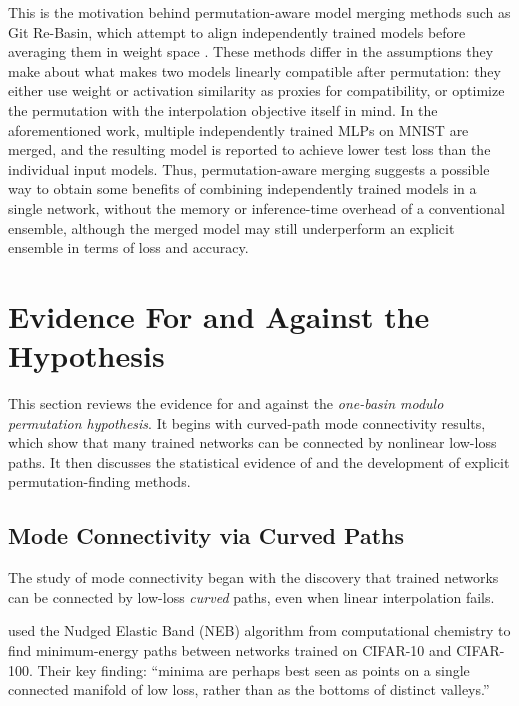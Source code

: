 \documentclass[11pt,a4paper]{report}
\begin{document}
This is the motivation behind permutation-aware model merging methods such as Git 
Re-Basin, which attempt to align independently trained models before averaging 
them in weight space \citet{ainsworth2023git}. These methods differ in the assumptions they make about what makes two models linearly compatible after permutation: they either use weight or activation similarity as 
proxies for compatibility, or optimize the permutation with the interpolation 
objective itself in mind. In the aforementioned work, multiple independently trained MLPs on MNIST are merged, and the resulting model is reported to achieve lower test loss than the individual input models. Thus, permutation-aware merging suggests a possible way to obtain some benefits of combining independently trained models in a single network, without the memory or inference-time overhead of a conventional ensemble, although the merged model may 
still underperform an explicit ensemble in terms of loss and accuracy.

\section{Evidence For and Against the Hypothesis}
\label{sec:literature}

This section reviews the evidence for and against the \textit{one-basin modulo 
permutation hypothesis}. It begins with curved-path mode connectivity results, 
which show that many trained networks can be connected by nonlinear low-loss paths. 
It then discusses the statistical evidence of \citet{entezari2021role} and the 
development of explicit permutation-finding methods.

\subsection{Mode Connectivity via Curved Paths}

The study of mode connectivity began with the discovery that trained networks can be connected by low-loss \textit{curved} paths, even when linear interpolation fails.

\citet{draxler2018essentially} used the Nudged Elastic Band (NEB) algorithm from computational chemistry to find minimum-energy paths between networks trained on CIFAR-10 and CIFAR-100. Their key finding: ``minima are perhaps best seen as points on a single connected manifold of low loss, rather than as the bottoms of distinct valleys.''
\end{document}
